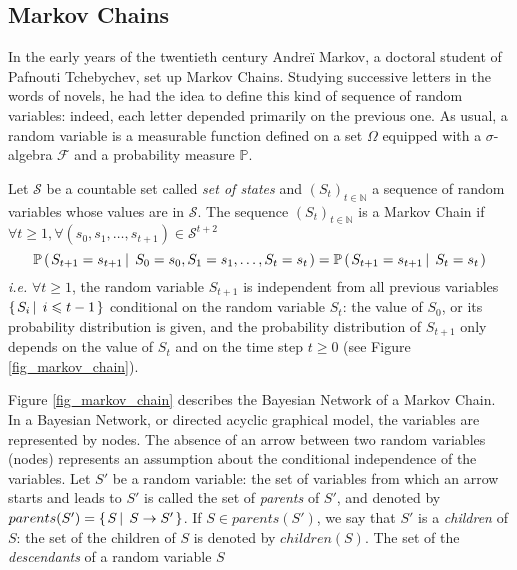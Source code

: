 \subsection{Markov Chains}
\label{section_MarkovChains}
In the early years of the twentieth century Andre\"i Markov,
a doctoral student of Pafnouti Tchebychev, 
set up Markov Chains. 
Studying successive letters in the words of novels,
he had the idea to define this kind of sequence of random variables:
indeed, each letter depended primarily on the previous one. 
As usual, a random variable 
is a measurable function defined 
on a set $\Omega$ equipped with a $\sigma$-algebra $\mathcal{F}$
and a probability measure $\mathbb{P}$. 
\begin{Def}
\label{def_markov_chain}
Let $\mathcal{S}$ be a countable set called \textit{set of states}
and $(S_t)_{t \in \mathbb{N}}$ a sequence of random variables
whose values are in $\mathcal{S}$. The sequence $(S_t)_{t \in \mathbb{N}}$ 
is a Markov Chain if $\forall t \geqslant 1,  \forall (s_0,s_1,\ldots,s_{t+1}) \in \mathcal{S}^{t+2}$
\begin{equation}
\label{eq_markov_property}
\mathbb{P} \left( \left.  S_{t+1} = s_{t+1} \, \right| \left. \, S_0 = s_0,S_1=s_1, \ldots, S_t=s_t \right. \right) 
= \mathbb{P} \left( \left.  S_{t+1} = s_{t+1} \, \right| \left. \, S_t = s_{t}  \right. \right)
\end{equation}
\textit{i.e.} $\forall t \geqslant 1$,
the random variable $S_{t+1}$ 
is independent from all previous variables 
$\left\{ \left.  S_i \, \right| \left. \, i \leqslant t-1  \right. \right\}$
conditional on the random variable $S_t$:
the value of $S_0$, or its probability distribution is given, and
the probability distribution of $S_{t+1}$ only depends on 
the value of $S_t$ and on the time step $t \geqslant 0$ 
(see Figure \ref{fig_markov_chain}).
\end{Def}
Figure \ref{fig_markov_chain} describes 
the Bayesian Network \cite{Pearl:1988:PRI:52121,pearl85bayesian} of a Markov Chain.
In a Bayesian Network, or directed acyclic graphical model, 
the variables are represented by nodes. 
The absence of an arrow between two random variables (nodes) 
represents an assumption about the conditional independence of the variables.
Let $S'$ be a random variable: 
the set of variables from which an arrow starts 
and leads to $S'$ is called the set of \textit{parents} of $S'$, 
and denoted by $parents(S') = \left\{ \left.  S \, \right| \left. \, S \rightarrow S'  \right. \right\}$.
If $S \in parents(S')$, we say that $S'$ is a \textit{children} of $S$: 
the set of the children of $S$ is denoted by $children(S)$.
The set of the \textit{descendants} of a random variable $S$ 
